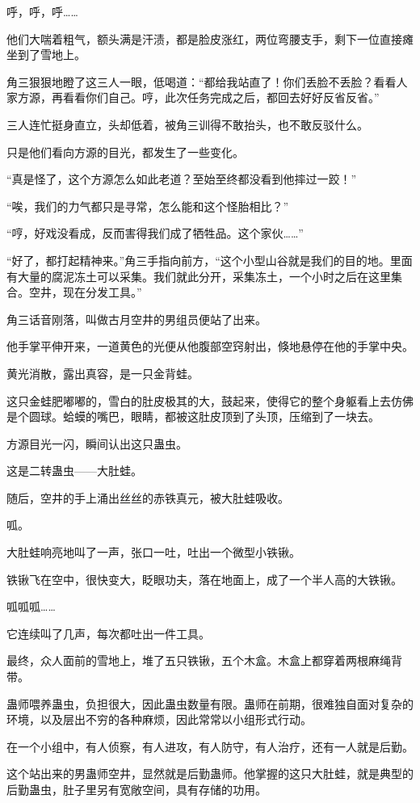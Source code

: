\begin{this_body}
呼，呼，呼……

他们大喘着粗气，额头满是汗渍，都是脸皮涨红，两位弯腰支手，剩下一位直接瘫坐到了雪地上。

角三狠狠地瞪了这三人一眼，低喝道：“都给我站直了！你们丢脸不丢脸？看看人家方源，再看看你们自己。哼，此次任务完成之后，都回去好好反省反省。”

三人连忙挺身直立，头却低着，被角三训得不敢抬头，也不敢反驳什么。

只是他们看向方源的目光，都发生了一些变化。

“真是怪了，这个方源怎么如此老道？至始至终都没看到他摔过一跤！”

“唉，我们的力气都只是寻常，怎么能和这个怪胎相比？”

“哼，好戏没看成，反而害得我们成了牺牲品。这个家伙……”

“好了，都打起精神来。”角三手指向前方，“这个小型山谷就是我们的目的地。里面有大量的腐泥冻土可以采集。我们就此分开，采集冻土，一个小时之后在这里集合。空井，现在分发工具。”

角三话音刚落，叫做古月空井的男组员便站了出来。

他手掌平伸开来，一道黄色的光便从他腹部空窍射出，倏地悬停在他的手掌中央。

黄光消散，露出真容，是一只金背蛙。

这只金蛙肥嘟嘟的，雪白的肚皮极其的大，鼓起来，使得它的整个身躯看上去仿佛是个圆球。蛤蟆的嘴巴，眼睛，都被这肚皮顶到了头顶，压缩到了一块去。

方源目光一闪，瞬间认出这只蛊虫。

这是二转蛊虫——大肚蛙。

随后，空井的手上涌出丝丝的赤铁真元，被大肚蛙吸收。

呱。

大肚蛙响亮地叫了一声，张口一吐，吐出一个微型小铁锹。

铁锹飞在空中，很快变大，眨眼功夫，落在地面上，成了一个半人高的大铁锹。

呱呱呱……

它连续叫了几声，每次都吐出一件工具。

最终，众人面前的雪地上，堆了五只铁锹，五个木盒。木盒上都穿着两根麻绳背带。

蛊师喂养蛊虫，负担很大，因此蛊虫数量有限。蛊师在前期，很难独自面对复杂的环境，以及层出不穷的各种麻烦，因此常常以小组形式行动。

在一个小组中，有人侦察，有人进攻，有人防守，有人治疗，还有一人就是后勤。

这个站出来的男蛊师空井，显然就是后勤蛊师。他掌握的这只大肚蛙，就是典型的后勤蛊虫，肚子里另有宽敞空间，具有存储的功用。


\end{this_body}
